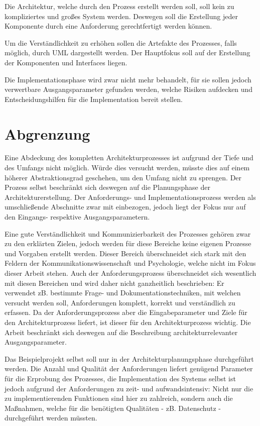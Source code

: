 Die Architektur, welche durch den Prozess erstellt werden soll, soll kein zu kompliziertes und großes System werden. Deswegen soll die Erstellung jeder Komponente durch eine Anforderung gerechtfertigt werden können.

Um die Verständlichkeit zu erhöhen sollen die Artefakte des Prozesses, falls möglich, durch UML dargestellt werden. Der Hauptfokus soll auf der Erstellung der Komponenten und Interfaces liegen.

Die Implementationsphase wird zwar nicht mehr behandelt, für sie sollen jedoch verwertbare Ausgangsparameter gefunden werden, welche Risiken aufdecken und Entscheidungshilfen für die Implementation bereit stellen.


\section{Abgrenzung}
Eine Abdeckung des kompletten Architekturprozesses ist aufgrund der Tiefe und des Umfangs nicht möglich. Würde dies versucht werden, müsste dies auf einem  höherer Abstraktionsgrad geschehen, um den Umfang nicht zu sprengen. Der Prozess selbst beschränkt sich deswegen auf die Planungsphase der Architekturerstellung. Der Anforderungs- und Implementationsprozess werden als umschließende Abschnitte zwar mit einbezogen, jedoch liegt der Fokus nur auf den Eingangs- respektive Ausgangsparametern.

Eine gute Verständlichkeit und Kommunizierbarkeit des Prozesses gehören zwar zu den erklärten Zielen, jedoch werden für diese Bereiche keine eigenen Prozesse und Vorgaben erstellt werden. Dieser Bereich überschneidet sich stark mit den Feldern der Kommunikationswissenschaft und Psychologie, welche nicht im Fokus dieser Arbeit stehen. Auch der Anforderungsprozess überschneidet sich wesentlich mit diesen Bereichen und wird daher nicht ganzheitlich beschrieben: Er verwendet zB. bestimmte Frage- und Dokumentationstechniken, mit welchen versucht werden soll, Anforderungen komplett, korrekt und verständlich zu erfassen. Da der Anforderungsprozess aber die Eingabeparameter und Ziele für den Architekturprozess liefert, ist dieser für den Architekturprozess wichtig. Die Arbeit beschränkt sich deswegen auf die Beschreibung architekturrelevanter Ausgangsparameter.

Das Beispielprojekt selbst soll nur in der Architekturplanungsphase durchgeführt werden. Die Anzahl und Qualität der Anforderungen liefert genügend Parameter für die Erprobung des Prozesses, die Implementation des Systems selbst ist jedoch aufgrund der Anforderungen zu zeit- und aufwandsintensiv: Nicht nur die zu implementierenden Funktionen sind hier zu zahlreich, sondern auch die Maßnahmen, welche für die benötigten Qualitäten - zB. Datenschutz - durchgeführt werden müssten.

